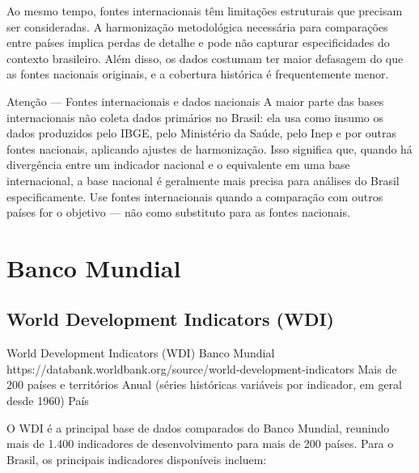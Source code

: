 Ao mesmo tempo, fontes internacionais têm limitações estruturais que precisam ser consideradas. A harmonização metodológica necessária para comparações entre países implica perdas de detalhe e pode não capturar especificidades do contexto brasileiro. Além disso, os dados costumam ter maior defasagem do que as fontes nacionais originais, e a cobertura histórica é frequentemente menor.

\begin{boxatencao}{Atenção --- Fontes internacionais e dados nacionais}
A maior parte das bases internacionais não coleta dados primários no Brasil: ela usa como insumo os dados produzidos pelo IBGE, pelo Ministério da Saúde, pelo Inep e por outras fontes nacionais, aplicando ajustes de harmonização. Isso significa que, quando há divergência entre um indicador nacional e o equivalente em uma base internacional, a base nacional é geralmente mais precisa para análises do Brasil especificamente. Use fontes internacionais quando a comparação com outros países for o objetivo --- não como substituto para as fontes nacionais.
\end{boxatencao}

\section{Banco Mundial}

\subsection{World Development Indicators (WDI)}

\ficharapida
  {World Development Indicators (WDI)}
  {Banco Mundial}
  {https://databank.worldbank.org/source/world-development-indicators}
  {Mais de 200 países e territórios}
  {Anual (séries históricas variáveis por indicador, em geral desde 1960)}
  {País}

O WDI é a principal base de dados comparados do Banco Mundial, reunindo mais de 1.400 indicadores de desenvolvimento para mais de 200 países. Para o Brasil, os principais indicadores disponíveis incluem:

